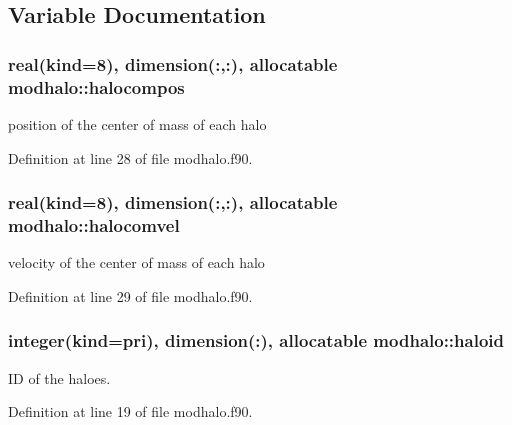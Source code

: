 \subsection{Variable Documentation}
\subsubsection[{\texorpdfstring{halocompos}{halocompos}}]{\setlength{\rightskip}{0pt plus 5cm}real(kind=8), dimension(\+:,\+:), allocatable modhalo\+::halocompos}\hypertarget{namespacemodhalo_a872c41ce5ed017bb6f443156dd18d0af}{}\label{namespacemodhalo_a872c41ce5ed017bb6f443156dd18d0af}


position of the center of mass of each halo 



Definition at line 28 of file modhalo.\+f90.

\subsubsection[{\texorpdfstring{halocomvel}{halocomvel}}]{\setlength{\rightskip}{0pt plus 5cm}real(kind=8), dimension(\+:,\+:), allocatable modhalo\+::halocomvel}\hypertarget{namespacemodhalo_ad9aa6bd557e4766c0d1d612e203a1e67}{}\label{namespacemodhalo_ad9aa6bd557e4766c0d1d612e203a1e67}


velocity of the center of mass of each halo 



Definition at line 29 of file modhalo.\+f90.

\subsubsection[{\texorpdfstring{haloid}{haloid}}]{\setlength{\rightskip}{0pt plus 5cm}integer(kind=pri), dimension(\+:), allocatable modhalo\+::haloid}\hypertarget{namespacemodhalo_a28d1d14569d3cd370d375aca76fd838c}{}\label{namespacemodhalo_a28d1d14569d3cd370d375aca76fd838c}


ID of the haloes. 



Definition at line 19 of file modhalo.\+f90.

